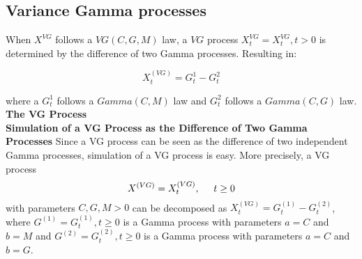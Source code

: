 
\subsection{Variance Gamma processes}

When $X^{VG}$ follows a  $VG(C,G,M)$ law, a ${VG}$ process $X_{t}^{VG}= {X_{t}^{VG}, t>0}$ is determined by the difference of two Gamma processes. Resulting in:

 \begin{equation}
    X_{t}^{(VG)} = G_{t}^{1} - G_{t}^{2}   
    \label{eq:var-gamma}
\end{equation}

where a $G_{t}^{1}$ follows a $Gamma(C,M)$ law and $G_{t}^{2}$ follows a $Gamma(C,G)$ law.\\

\textbf{The VG Process}\\
\textbf{Simulation of a VG Process as the Difference of Two Gamma Processes}
Since a VG process can be seen as the difference of two independent Gamma processes, simulation of a VG process is easy. More precisely, a VG process
\begin{equation}
X^{(VG)} = {X_{t}^{(VG)}, \hspace{0.5cm}t\geq0}
\end{equation} 
with parameters $C, G, M > 0$ can be decomposed as $X_{t}^{(VG)} = G_{t}^{(1)} - G_{t}^{(2)}$, where $G^{(1)} = {G_{t}^{(1)}, t\geq0}$ is a Gamma process with parameters $a=C$ and $b=M$ and $G^{(2)} = {G_{t}^{(2)}, t\geq0}$ is a Gamma process with parameters $a=C$ and $b=G$.